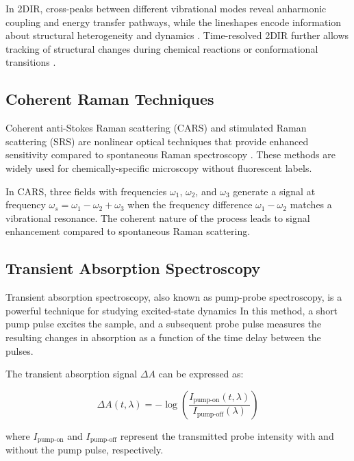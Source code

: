 \noindent In 2DIR, cross-peaks between different vibrational modes reveal anharmonic coupling and energy transfer pathways, while the lineshapes encode information about structural heterogeneity and dynamics \cite{khaliletal2004vibrationalcoherencetransfer}. Time-resolved 2DIR further allows tracking of structural changes during chemical reactions or conformational transitions \cite{fayer2009dynamicsliquidsmolecules}.

\subsection{Coherent Raman Techniques}
\label{subsec:coherent_raman}

\noindent Coherent anti-Stokes Raman scattering (CARS) and stimulated Raman scattering (SRS) are nonlinear optical techniques that provide enhanced sensitivity compared to spontaneous Raman spectroscopy \cite{boyd2008contents}. These methods are widely used for chemically-specific microscopy without fluorescent labels.

\noindent In CARS, three fields with frequencies $\omega_1$, $\omega_2$, and $\omega_3$ generate a signal at frequency $\omega_s = \omega_1 - \omega_2 + \omega_3$ when the frequency difference $\omega_1 - \omega_2$ matches a vibrational resonance. The coherent nature of the process leads to signal enhancement compared to spontaneous Raman scattering.

\subsection{Transient Absorption Spectroscopy}
\label{subsec:transient_absorption}

\noindent Transient absorption spectroscopy, also known as pump-probe spectroscopy, is a powerful technique for studying excited-state dynamics %
In this method, a short pump pulse excites the sample, and a subsequent probe pulse measures the resulting changes in absorption as a function of the time delay between the pulses.

\noindent The transient absorption signal $\Delta A$ can be expressed as:

\begin{equation}
	\Delta A(t, \lambda) = -\log\left(\frac{I_{\text{pump-on}}(t, \lambda)}{I_{\text{pump-off}}(\lambda)}\right)
	\label{eq:transient_absorption}
\end{equation}

\noindent where $I_{\text{pump-on}}$ and $I_{\text{pump-off}}$ represent the transmitted probe intensity with and without the pump pulse, respectively.

